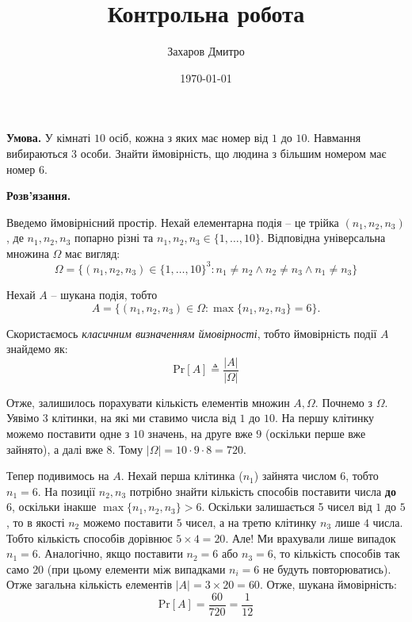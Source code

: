 \documentclass[oneside,solution]{karazin-prob-theory-assign}
\title{Контрольна робота}
\author{Захаров Дмитро}
\date{\today}
\begin{document}
\maketitle



\textbf{Умова.} У кімнаті $10$ осіб, кожна з яких має номер від $1$ до $10$. Навмання вибираються 3 особи. Знайти ймовірність, що людина з більшим номером має номер $6$.

\textbf{Розв'язання.} 

Введемо ймовірнісний простір. Нехай елементарна подія -- це трійка $(n_1,n_2,n_3)$, де $n_1,n_2,n_3$ попарно різні та $n_1,n_2,n_3 \in \{1,\dots,10\}$. Відповідна універсальна множина $\Omega$ має вигляд:
\begin{equation}
    \Omega = \{(n_1,n_2,n_3) \in \{1,\dots,10\}^3: n_1 \neq n_2 \wedge n_2 \neq n_3 \wedge n_1 \neq n_3\}
\end{equation}

Нехай $A$ -- шукана подія, тобто
\begin{equation}
    A = \{(n_1,n_2,n_3) \in \Omega: \max\{n_1,n_2,n_3\} = 6\}.
\end{equation}

Скористаємось \textit{класичним визначенням ймовірності}, тобто ймовірність події $A$ знайдемо як:
\begin{equation}
    \text{Pr}[A] \triangleq \frac{|A|}{|\Omega|}
\end{equation}

Отже, залишилось порахувати кількість елементів множин $A,\Omega$. Почнемо з $\Omega$. Уявімо $3$ клітинки, на які ми ставимо числа від $1$ до $10$. На першу клітинку можемо поставити одне з $10$ значень, на друге вже $9$ (оскільки перше вже зайнято), а далі вже $8$. Тому $|\Omega| = 10 \cdot 9 \cdot 8 = 720$. 

Тепер подивимось на $A$. Нехай перша клітинка ($n_1$) зайнята числом $6$, тобто $n_1=6$. На позиції $n_2,n_3$ потрібно знайти кількість способів поставити числа \textbf{до} 6, оскільки інакше $\max\{n_1,n_2,n_3\} > 6$. Оскільки залишається 5 чисел від $1$ до $5$, то в якості $n_2$ можемо поставити $5$ чисел, а на третю клітинку $n_3$ лише $4$ числа. Тобто кількість способів дорівнює $5 \times 4 = 20$. Але! Ми врахували лише випадок $n_1=6$. Аналогічно, якщо поставити $n_2=6$ або $n_3=6$, то кількість способів так само $20$ (при цьому елементи між випадками $n_i=6$ не будуть повторюватись). Отже загальна кількість елементів $|A|=3\times 20=60$. Отже, шукана ймовірність:
\begin{equation}
    \text{Pr}[A] = \frac{60}{720} = \boxed{\frac{1}{12}}
\end{equation}
\end{document}

